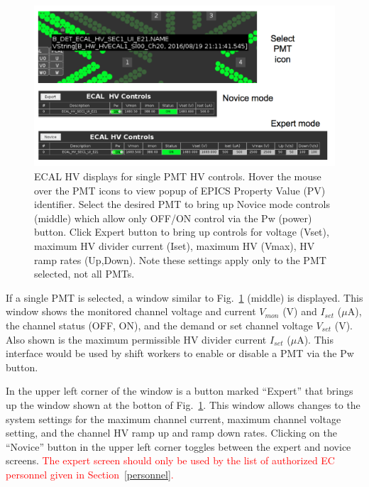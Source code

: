 \documentclass[letterpaper,10pt]{article}
\begin{document}
\begin{figure}[htbp]
  \centering
  \includegraphics[width= 6in, keepaspectratio = true]{expert-novice}
  \vspace{2mm}
  \caption{ECAL HV displays for single PMT HV controls.  Hover the mouse over the PMT icons to
    view popup of EPICS Property Value (PV) identifier. Select the desired PMT to bring up Novice
    mode controls (middle) which allow only OFF/ON control via the Pw (power) button.  Click Expert button to
    bring up controls for voltage (Vset), maximum HV divider current (Iset), maximum HV (Vmax), HV ramp
  rates (Up,Down). Note these settings apply only to the PMT selected, not all PMTs.}
  \label{ecal-screen3}
\end{figure}

If a single PMT is selected, a window similar to Fig.~\ref{ecal-screen3} (middle) is displayed. This
window shows the monitored channel voltage and current $V_{mon}$ (V) and $I_{set}$ ($\mu$A), the channel status (OFF, ON),
and the demand or set channel voltage $V_{set}$ (V).  Also shown is the maximum permissible HV divider
current $I_{set}$ ($\mu$A).  This interface would be used by shift workers to enable or disable a
PMT via the Pw button.

In the upper left corner of the window is a button marked ``Expert'' that
brings up the window shown at the botton of Fig.~\ref{ecal-screen3}. This window allows changes to the system settings
for the maximum channel current, maximum channel voltage setting, and the channel HV ramp up and 
ramp down rates.   Clicking on the ``Novice'' button
in the upper left corner toggles between the 
expert and novice screens. \textcolor{red}{The expert screen should only be used by the list of 
authorized EC personnel given in Section~\ref{personnel}.} 
\end{document}
